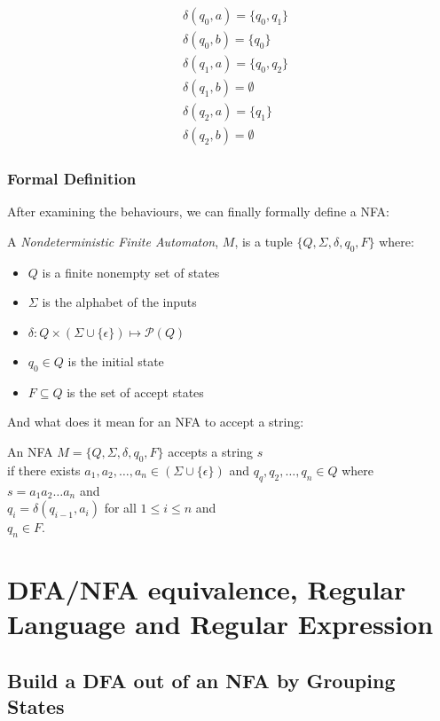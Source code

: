 \documentclass[11pt]{article}
\begin{document}
\begin{align*}
&\delta(q_0, a) = \{q_0,q_1\} \\
&\delta(q_0, b) = \{q_0\} \\
&\delta(q_1, a) = \{q_0,q_2\} \\
&\delta(q_1, b) = \emptyset \\
&\delta(q_2, a) = \{q_1\} \\
&\delta(q_2, b) = \emptyset
\end{align*}

\subsubsection{Formal Definition}

After examining the behaviours, we can finally formally define a NFA:
\begin{definition}
A \emph{Nondeterministic Finite Automaton}, $M$, is a tuple $\{Q,\Sigma,\delta,q_0,F\}$ where:
\begin{itemize}
\item $Q$ is a finite nonempty set of states
\item $\Sigma$ is the alphabet of the inputs
\item $\delta : Q \times (\Sigma \cup \{\epsilon\}) \mapsto \mathcal{P}(Q)$
\item $q_0 \in Q$ is the initial state
\item $F \subseteq Q$ is the set of accept states
\end{itemize}
\end{definition}

And what does it mean for an NFA to accept a string:
\begin{definition}
An NFA $M = \{Q,\Sigma,\delta,q_0,F\}$ accepts a string $s$ \\
if there exists
$a_1,a_2,\dots,a_n \in (\Sigma \cup \{\epsilon\})$ and
$q_q,q_2,\dots,q_n \in Q$ where \\
$s = a_1 a_2 \dots a_n$ and \\
$q_i = \delta(q_{i-1},a_i)$ for all $1 \leq i \leq n$ and \\
$q_n \in F$.
\end{definition}

\section{DFA/NFA equivalence, Regular Language and Regular Expression}

\subsection{Build a DFA out of an NFA by Grouping States} \label{subsec:5.1}
\end{document}

